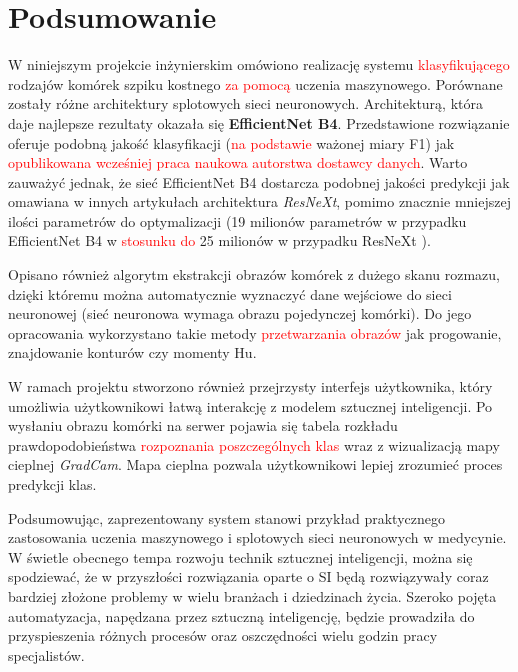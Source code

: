 \chapter{Podsumowanie}

W niniejszym projekcie inżynierskim omówiono realizację systemu \textcolor{red}{klasyfikującego} rodzajów komórek szpiku kostnego \textcolor{red}{za pomocą} uczenia maszynowego.
Porównane zostały różne architektury splotowych sieci neuronowych.
Architekturą, która daje najlepsze rezultaty okazała się \textbf{EfficientNet B4}.
Przedstawione rozwiązanie oferuje podobną jakość klasyfikacji (\textcolor{red}{na podstawie} ważonej miary F1) jak \textcolor{red}{opublikowana wcześniej praca naukowa autorstwa dostawcy danych}.
Warto zauważyć jednak, że sieć EfficientNet B4 dostarcza podobnej jakości predykcji jak omawiana w innych artykułach architektura \textit{ResNeXt}, pomimo znacznie mniejszej ilości parametrów do optymalizacji (19 milionów parametrów w przypadku EfficientNet B4 w \textcolor{red}{stosunku do} 25 milionów w przypadku ResNeXt \cite{resnext}).

Opisano również algorytm ekstrakcji obrazów komórek z dużego skanu rozmazu, dzięki któremu można automatycznie wyznaczyć dane wejściowe do sieci neuronowej (sieć neuronowa wymaga obrazu pojedynczej komórki).
Do jego opracowania wykorzystano takie metody \textcolor{red}{przetwarzania obrazów} jak progowanie, znajdowanie konturów czy momenty Hu.

W ramach projektu stworzono również przejrzysty interfejs użytkownika, który umożliwia użytkownikowi łatwą interakcję z modelem sztucznej inteligencji.
Po wysłaniu obrazu komórki na serwer pojawia się tabela rozkładu prawdopodobieństwa \textcolor{red}{ rozpoznania poszczególnych klas} wraz z wizualizacją mapy cieplnej \textit{GradCam}.
Mapa cieplna pozwala użytkownikowi lepiej zrozumieć proces predykcji klas.

Podsumowując, zaprezentowany system stanowi przykład praktycznego zastosowania uczenia maszynowego i splotowych sieci neuronowych w medycynie.
W świetle obecnego tempa rozwoju technik sztucznej inteligencji, można się spodziewać, że w przyszłości rozwiązania oparte o SI będą rozwiązywały coraz bardziej złożone problemy w wielu branżach i dziedzinach życia.
Szeroko pojęta automatyzacja, napędzana przez sztuczną inteligencję, będzie prowadziła do przyspieszenia różnych procesów oraz oszczędności wielu godzin pracy specjalistów.